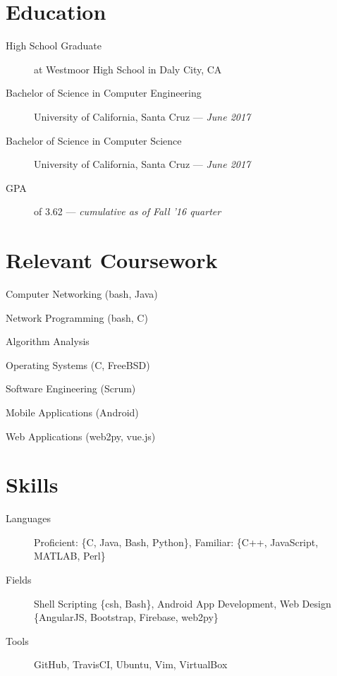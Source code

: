 \documentclass[10pt]{article}
\author{August Valera}
\begin{document}

\section*{Education}
\begin{description}
  \item[High School Graduate] at Westmoor High School in Daly City, CA
  \item[Bachelor of Science in Computer Engineering] University of California, Santa Cruz --- \textit{June 2017}
  \item[Bachelor of Science in Computer Science] University of California, Santa Cruz --- \textit{June 2017}
  \item[GPA] of 3.62 --- \textit{cumulative as of Fall '16 quarter}
\end{description}

\section*{Relevant Coursework}
\begin{itemize}
    \begin{multicols}{2}
    \item Computer Networking (bash, Java) %
    \item Network Programming (bash, C) %
    \item Algorithm Analysis %
    \item Operating Systems (C, FreeBSD) %
    \item Software Engineering (Scrum) %
    \item Mobile Applications (Android) %
    \item Web Applications (web2py, vue.js) %
    \end{multicols}
\end{itemize}

\section*{Skills}
\begin{description}
  \item[Languages] Proficient: \{C, Java, Bash, Python\},
    Familiar: \{C++, JavaScript, MATLAB, Perl\}
  \item[Fields] Shell Scripting \{csh, Bash\}, Android App Development, Web
    Design \{AngularJS, Bootstrap, Firebase, web2py\}
  \item[Tools] GitHub, TravisCI, Ubuntu, Vim, VirtualBox
\end{description}
\end{document}

